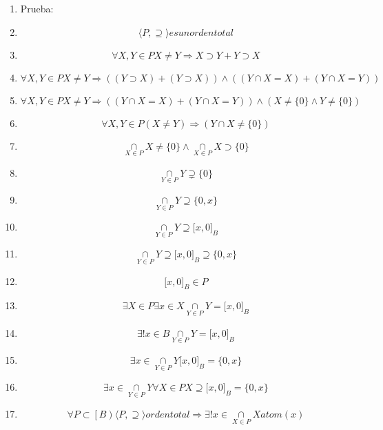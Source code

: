 \begin{enumerate}
\begin{enumerate}
\begin{enumerate}
      \begin{enumerate}
      \def\labelenumiv{\arabic{enumiv}.}
      \tightlist
      \item
        Prueba:
      \item
        \[{\langle{P, \supseteq}\rangle}\mathit{es}\mathit{un}\mathit{orden}\mathit{total}\]
      \item
        \[\forall X,{Y \in P}{X \neq Y}\Rightarrow{{X \supset {Y + Y}} \supset X}\]
      \item
        \[\forall X,{Y \in P}{X \neq Y}\Rightarrow{\left( {\left( {Y \supset X} \right) + \left( {Y \supset X} \right)} \right) \land \left( {\left( {{Y \cap X} = X} \right) + \left( {{Y \cap X} = Y} \right)} \right)}\]
      \item
        \[\forall X,{Y \in P}{X \neq Y}\Rightarrow{\left( {\left( {{Y \cap X} = X} \right) + \left( {{Y \cap X} = Y} \right)} \right) \land \left( {{X \neq {{\{ 0\}} \land Y}} \neq {\{ 0\}}} \right)}\]
      \item
        \[\forall X,{Y \in P}\left( {X \neq Y} \right)\Rightarrow\left( {{Y \cap X} \neq {\{ 0\}}} \right)\]
      \item
        \[\underset{X \in P}{\cap}{X \neq {{\{ 0\}} \land \underset{X \in P}{\cap}}}{X \supset {\{ 0\}}}\]
      \item
        \[\underset{Y \in P}{\cap}Y \supsetneq {\{ 0\}}\]
      \item
        \[\underset{Y \in P}{\cap}{Y \supseteq {\{{0,x}\}}}\]
      \item
        \[\underset{Y \in P}{\cap}{Y \supseteq {\lbrack{x,0}\rbrack}_{B}}\]
      \item
        \[\underset{Y \in P}{\cap}{{Y \supseteq {\lbrack{x,0}\rbrack}_{B}} \supseteq {\{{0,x}\}}}\]
      \item
        \[{\lbrack{x,0}\rbrack}_{B} \in P\]
      \item
        \[\exists{X \in P}\exists{x \in X}{\underset{Y \in P}{\cap}{Y = {\lbrack{x,0}\rbrack}_{B}}}\]
      \item
        \[\exists!{x \in B}{\underset{Y \in P}{\cap}{Y = {\lbrack{x,0}\rbrack}_{B}}}\]
      \item
        \[\exists{x \in {\underset{Y \in P}{\cap}Y{{\lbrack{x,0}\rbrack}_{B} = {\{{0,x}\}}}}}\]
      \item
        \[\exists{x \in {\underset{Y \in P}{\cap}Y\forall{X \in P}{{X \supseteq {\lbrack{x,0}\rbrack}_{B}} = {\{{0,x}\}}}}}\]
      \item
        \[\forall{P \subset \left\lbrack B \right)}{\langle{P, \supseteq}\rangle}\mathit{orden}\mathit{total}\Rightarrow\exists!{x \in \underset{X \in P}{\cap}}X\mathit{atom}(x)\]

\end{enumerate}
\end{enumerate}
\end{enumerate}
\end{enumerate}
